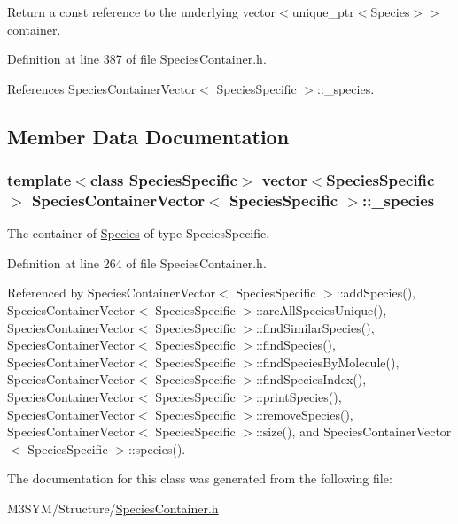Return a const reference to the underlying vector$<$unique\+\_\+ptr$<$\+Species$>$$>$ container. 



Definition at line 387 of file Species\+Container.\+h.



References Species\+Container\+Vector$<$ Species\+Specific $>$\+::\+\_\+species.



\subsection{Member Data Documentation}
\hypertarget{classSpeciesContainerVector_a0dde776cfb79686cc42cfa41ce546f45}{
\subsubsection[{\+\_\+species}]{\setlength{\rightskip}{0pt plus 5cm}template$<$class Species\+Specific$>$ vector$<$Species\+Specific$>$ {\bf Species\+Container\+Vector}$<$ Species\+Specific $>$\+::\+\_\+species\hspace{0.3cm}{\ttfamily [protected]}}}\label{classSpeciesContainerVector_a0dde776cfb79686cc42cfa41ce546f45}


The container of \hyperlink{classSpecies}{Species} of type Species\+Specific. 



Definition at line 264 of file Species\+Container.\+h.



Referenced by Species\+Container\+Vector$<$ Species\+Specific $>$\+::add\+Species(), Species\+Container\+Vector$<$ Species\+Specific $>$\+::are\+All\+Species\+Unique(), Species\+Container\+Vector$<$ Species\+Specific $>$\+::find\+Similar\+Species(), Species\+Container\+Vector$<$ Species\+Specific $>$\+::find\+Species(), Species\+Container\+Vector$<$ Species\+Specific $>$\+::find\+Species\+By\+Molecule(), Species\+Container\+Vector$<$ Species\+Specific $>$\+::find\+Species\+Index(), Species\+Container\+Vector$<$ Species\+Specific $>$\+::print\+Species(), Species\+Container\+Vector$<$ Species\+Specific $>$\+::remove\+Species(), Species\+Container\+Vector$<$ Species\+Specific $>$\+::size(), and Species\+Container\+Vector$<$ Species\+Specific $>$\+::species().



The documentation for this class was generated from the following file\+:\begin{DoxyCompactItemize}
\item 
M3\+S\+Y\+M/\+Structure/\hyperlink{SpeciesContainer_8h}{Species\+Container.\+h}\end{DoxyCompactItemize}
